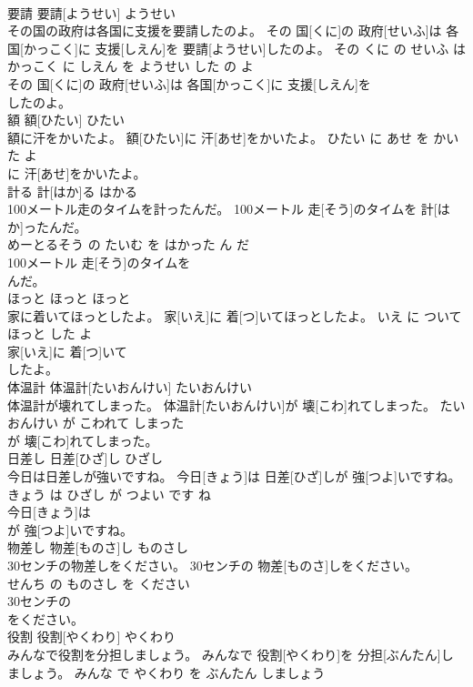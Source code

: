 \documentclass[8pt]{extreport}
\begin{document}
\begin{CJK}{UTF8}{min}
\\	要請	要請[ようせい]	ようせい	
\\	その国の政府は各国に支援を要請したのよ。	その 国[くに]の 政府[せいふ]は 各国[かっこく]に 支援[しえん]を 要請[ようせい]したのよ。	その くに の せいふ は かっこく に しえん を ようせい した の よ	
\\	その 国[くに]の 政府[せいふ]は 各国[かっこく]に 支援[しえん]を
\\	したのよ。			
\\	額	額[ひたい]	ひたい	
\\	額に汗をかいたよ。	額[ひたい]に 汗[あせ]をかいたよ。	ひたい に あせ を かいた よ	
\\	に 汗[あせ]をかいたよ。			
\\	計る	計[はか]る	はかる	
\\	100メートル走のタイムを計ったんだ。	100メートル 走[そう]のタイムを 計[はか]ったんだ。	
\\	めーとるそう の たいむ を はかった ん だ	
\\	100メートル 走[そう]のタイムを
\\	んだ。			
\\	ほっと	ほっと	ほっと	
\\	家に着いてほっとしたよ。	家[いえ]に 着[つ]いてほっとしたよ。	いえ に ついて ほっと した よ	
\\	家[いえ]に 着[つ]いて
\\	したよ。			
\\	体温計	体温計[たいおんけい]	たいおんけい	
\\	体温計が壊れてしまった。	体温計[たいおんけい]が 壊[こわ]れてしまった。	たいおんけい が こわれて しまった	
\\	が 壊[こわ]れてしまった。			
\\	日差し	日差[ひざ]し	ひざし	
\\	今日は日差しが強いですね。	今日[きょう]は 日差[ひざ]しが 強[つよ]いですね。	きょう は ひざし が つよい です ね	
\\	今日[きょう]は
\\	が 強[つよ]いですね。			
\\	物差し	物差[ものさ]し	ものさし	
\\	30センチの物差しをください。	30センチの 物差[ものさ]しをください。	
\\	せんち の ものさし を ください	
\\	30センチの
\\	をください。			
\\	役割	役割[やくわり]	やくわり	
\\	みんなで役割を分担しましょう。	みんなで 役割[やくわり]を 分担[ぶんたん]しましょう。	みんな で やくわり を ぶんたん しましょう	

\end{CJK}
\end{document}
